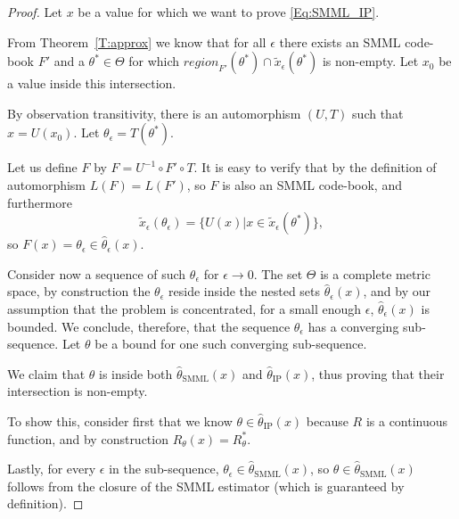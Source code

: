 \documentclass{IEEEtran}
\begin{document}
\begin{proof}
% 
% 
Let $x$ be a value for which we want to prove \eqref{Eq:SMML_IP}.

From Theorem~\ref{T:approx} we know that for all $\epsilon$ there exists
an SMML code-book $F'$ and a $\theta^*\in\Theta$ for which
$\textit{region}_{F'}(\theta^*)\cap \tilde{x}_{\epsilon}(\theta^*)$
is non-empty.
Let $x_0$ be a value inside this intersection.

By observation transitivity, there is an automorphism $(U,T)$ such that
$x=U(x_0)$. Let $\theta_\epsilon=T(\theta^*)$.

Let us define $F$ by $F=U^{-1}\circ F' \circ T$. It is easy to verify that by
the definition of automorphism $L(F)=L(F')$, so $F$ is also an SMML code-book,
and furthermore
\[
\tilde{x}_{\epsilon}(\theta_\epsilon)=\{U(x)|x\in\tilde{x}_\epsilon(\theta^*)\},
\]
so $F(x)=\theta_\epsilon\in\hat{\theta}_{\epsilon}(x)$.

Consider now a sequence of such $\theta_\epsilon$ for $\epsilon\to 0$.
The set $\Theta$ is a complete metric space, by construction the
$\theta_\epsilon$ reside inside the nested sets $\hat{\theta}_{\epsilon}(x)$,
and by our assumption that the problem is concentrated, for a small enough
$\epsilon$, $\hat{\theta}_{\epsilon}(x)$ is bounded. We conclude, therefore,
that the sequence $\theta_\epsilon$ has a converging sub-sequence. Let
$\theta$ be a bound for one such converging sub-sequence.

We claim that $\theta$ is inside both
$\hat{\theta}_{\text{SMML}}(x)$ and $\hat{\theta}_{\text{IP}}(x)$, thus
proving that their intersection is non-empty.

To show this, consider first that we know $\theta\in\hat{\theta}_{\text{IP}}(x)$
because $R$ is a continuous function, and by construction
$R_\theta(x)=R^*_{\theta}$.

Lastly, for every $\epsilon$ in the sub-sequence,
$\theta_\epsilon\in\hat{\theta}_{\text{SMML}}(x)$, so
$\theta\in\hat{\theta}_{\text{SMML}}(x)$ follows from the closure of the
SMML estimator (which is guaranteed by definition).
\end{proof}
\end{document}
